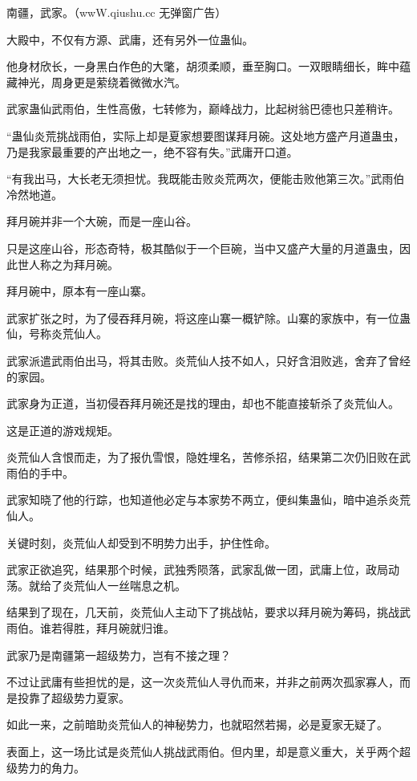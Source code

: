 
\begin{this_body}

南疆，武家。（wwW.qiushu.cc 无弹窗广告）

大殿中，不仅有方源、武庸，还有另外一位蛊仙。

他身材欣长，一身黑白作色的大氅，胡须柔顺，垂至胸口。一双眼睛细长，眸中蕴藏神光，周身更是萦绕着微微水汽。

武家蛊仙武雨伯，生性高傲，七转修为，巅峰战力，比起树翁巴德也只差稍许。

“蛊仙炎荒挑战雨伯，实际上却是夏家想要图谋拜月碗。这处地方盛产月道蛊虫，乃是我家最重要的产出地之一，绝不容有失。”武庸开口道。

“有我出马，大长老无须担忧。我既能击败炎荒两次，便能击败他第三次。”武雨伯冷然地道。

拜月碗并非一个大碗，而是一座山谷。

只是这座山谷，形态奇特，极其酷似于一个巨碗，当中又盛产大量的月道蛊虫，因此世人称之为拜月碗。

拜月碗中，原本有一座山寨。

武家扩张之时，为了侵吞拜月碗，将这座山寨一概铲除。山寨的家族中，有一位蛊仙，号称炎荒仙人。

武家派遣武雨伯出马，将其击败。炎荒仙人技不如人，只好含泪败逃，舍弃了曾经的家园。

武家身为正道，当初侵吞拜月碗还是找的理由，却也不能直接斩杀了炎荒仙人。

这是正道的游戏规矩。

炎荒仙人含恨而走，为了报仇雪恨，隐姓埋名，苦修杀招，结果第二次仍旧败在武雨伯的手中。

武家知晓了他的行踪，也知道他必定与本家势不两立，便纠集蛊仙，暗中追杀炎荒仙人。

关键时刻，炎荒仙人却受到不明势力出手，护住性命。

武家正欲追究，结果那个时候，武独秀陨落，武家乱做一团，武庸上位，政局动荡。就给了炎荒仙人一丝喘息之机。

结果到了现在，几天前，炎荒仙人主动下了挑战帖，要求以拜月碗为筹码，挑战武雨伯。谁若得胜，拜月碗就归谁。

武家乃是南疆第一超级势力，岂有不接之理？

不过让武庸有些担忧的是，这一次炎荒仙人寻仇而来，并非之前两次孤家寡人，而是投靠了超级势力夏家。

如此一来，之前暗助炎荒仙人的神秘势力，也就昭然若揭，必是夏家无疑了。

表面上，这一场比试是炎荒仙人挑战武雨伯。但内里，却是意义重大，关乎两个超级势力的角力。


\end{this_body}
